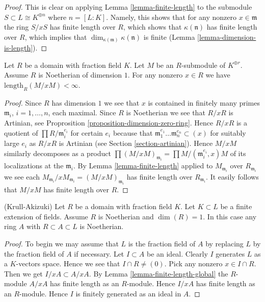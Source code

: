 \begin{proof}
This is clear on applying Lemma \ref{lemma-finite-length}
to the submodule $S \subset L \cong K^{\oplus n}$ where
$n = [L : K]$.
Namely, this shows that for any nonzero $x \in \mathfrak m$
the ring $S/xS$ has finite length over $R$, which shows
that $\kappa(\mathfrak n)$ has finite length over $R$,
which implies that $\dim_{\kappa(\mathfrak m)} \kappa(\mathfrak n)$
is finite (Lemma \ref{lemma-dimension-is-length}).
\end{proof}


\begin{lemma}
\label{lemma-finite-length-global}
Let $R$ be a domain with fraction field $K$.
Let $M$ be an $R$-submodule of $K^{\oplus r}$.
Assume $R$ is Noetherian of dimension $1$.
For any nonzero $x \in R$ we have
$\text{length}_R(M/xM) < \infty$.
\end{lemma}

\begin{proof}
Since $R$ has dimension $1$ we see that
$x$ is contained in finitely many primes
$\mathfrak m_i$, $i = 1, \ldots, n$, each maximal.
Since $R$ is Noetherian we see that $R/xR$ is Artinian,
see Proprosition \ref{proposition-dimension-zero-ring}.
Hence $R/xR$ is a quotient of
$\prod R/\mathfrak m_i^{e_i}$ for certain $e_i$ because
that $\mathfrak m_1^{e_1} \ldots \mathfrak m_n^{e_n} \subset (x)$
for suitably large $e_i$ as $R/xR$ is Artinian
(see Section \ref{section-artinian}).
Hence $M/xM$ similarly decomposes as a product
$\prod (M/xM)_{\mathfrak m_i} = \prod M/(\mathfrak m_i^{e_i}, x)M$
of its localizations at the $\mathfrak m_i$. By
Lemma \ref{lemma-finite-length} applied to $M_{\mathfrak m_i}$
over $R_{\mathfrak m_i}$ we see each
$M_{\mathfrak m_i}/xM_{\mathfrak m_i} = (M/xM)_{\mathfrak m_i}$
has finite length over $R_{\mathfrak m_i}$. It easily follows that $M/xM$
has finite length over $R$.
\end{proof}

\begin{lemma}
\label{lemma-krull-akizuki}
(Krull-Akizuki)
Let $R$ be a domain with fraction field $K$.
Let $K \subset L$ be a finite extension of fields.
Assume $R$ is Noetherian and $\dim(R) = 1$.
In this case any ring $A$ with $R \subset A \subset L$ is
Noetherian.
\end{lemma}

\begin{proof}
To begin we may assume that $L$ is the fraction field of $A$
by replacing $L$ by the fraction field of $A$ if necessary.
Let $I \subset A$ be an ideal. Clearly $I$ generates $L$ as
a $K$-vectors space. Hence we see that $I \cap R \not = (0)$.
Pick any nonzero $x \in I \cap R$. Then we get
$I/xA \subset A/xA$. By Lemma \ref{lemma-finite-length-global}
the $R$-module $A/xA$ has finite length as an $R$-module. Hence
$I/xA$ has finite length as an $R$-module. Hence $I$ is finitely
generated as an ideal in $A$.
\end{proof}

